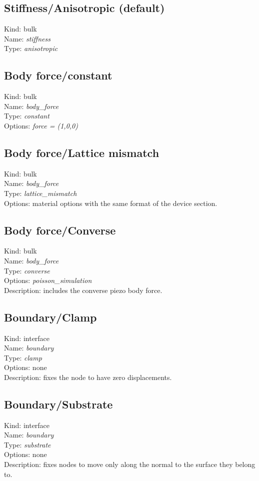 \subsection{Stiffness/Anisotropic (default)}
Kind: bulk \\
Name: \emph{stiffness}\\
Type: \emph{anisotropic} 

\subsection{Body force/constant}
Kind: bulk \\
Name: \emph{body\_force}\\
Type: \emph{constant}\\
Options: \emph{force = (1,0,0)}\\

\subsection{Body force/Lattice mismatch}
Kind: bulk \\
Name: \emph{body\_force}\\
Type: \emph{lattice\_mismatch}\\
Options: material options with the same format of the device section.

\subsection{Body force/Converse}

Kind: bulk \\
Name: \emph{body\_force}\\
Type: \emph{converse} \\
Options: \emph{poisson\_simulation}\\
Description: includes the converse piezo body force.

\subsection{Boundary/Clamp}
Kind: interface \\
Name: \emph{boundary}\\
Type: \emph{clamp} \\
Options: none \\
Description: fixes the node to have zero displacements.

\subsection{Boundary/Substrate}
Kind: interface \\
Name: \emph{boundary}\\
Type: \emph{substrate} \\
Options: none \\
Description: fixes nodes to move only along the normal to the surface they belong to.

